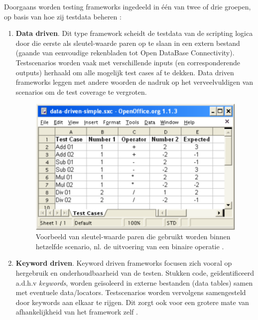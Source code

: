 Doorgaans worden testing frameworks ingedeeld in één van twee of drie groepen, op basis van hoe zij testdata beheren \autocite{Day2014} \autocite{Laukkanen2006}:

\begin{enumerate}
    \item \textbf{Data driven}. Dit type framework scheidt de testdata van de scripting logica door die eerste als sleutel-waarde paren op te slaan in een extern bestand (gaande van eenvoudige rekenbladen tot Open DataBase Connectivity). Testscenarios worden vaak met verschillende inputs (en corresponderende outputs) herhaald om alle mogelijk test cases af te dekken. Data driven frameworks leggen met andere woorden de nadruk op het verveelvuldigen van scenarios om de test coverage te vergroten.
    \begin{figure}[h!]
        \centering
        \includegraphics[scale=0.4]{img/Laukkanen2006DataDriven.PNG}
        \caption{Voorbeeld van sleutel-waarde paren die gebruikt worden binnen hetzelfde scenario, nl. de uitvoering van een binaire operatie \autocite{Laukkanen2006}.}
        \label{fig:laukkanendatadriven}
    \end{figure}
    \item \textbf{Keyword driven}. Keyword driven frameworks focusen zich vooral op hergebruik en onderhoudbaarheid van de testen. Stukken code, geïdentificeerd a.d.h.v \emph{keywords}, worden geïsoleerd in externe bestanden (data tables) samen met eventuele data/locators. Testscenarios worden vervolgens samengesteld door keywords aan elkaar te rijgen. Dit zorgt ook voor een grotere mate van afhankelijkheid van het framework zelf \autocite{Madan2013}.
        \begin{figure}[h!]
        \centering

\end{figure}
\end{enumerate}
